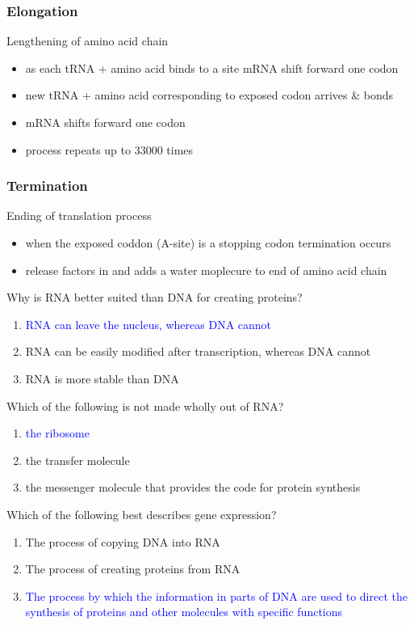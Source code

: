 \documentclass[11pt,fleqn]{book}
\begin{document}
\subsubsection{Elongation}
Lengthening of amino acid chain
\begin{itemize}
    \item as each tRNA + amino acid binds to a site mRNA shift forward one codon
    \item new tRNA + amino acid corresponding to exposed codon arrives \& bonds
    \item mRNA shifts forward one codon
    \item process repeats up to 33000 times
\end{itemize}
\subsubsection{Termination}
Ending of translation process
\begin{itemize}
    \item when the exposed coddon (A-site) is a stopping codon termination occurs
    \item release factors in and adds a water moplecure to end of amino acid chain
\end{itemize}

\begin{exercise}
    Why is RNA better suited than DNA for creating proteins?
    \begin{enumerate}
        \item \textcolor{blue}{RNA can leave the nucleus, whereas DNA cannot}
        \item RNA can be easily modified after transcription, whereas DNA cannot
        \item RNA is more stable than DNA
    \end{enumerate}
\end{exercise}
\begin{exercise}
    Which of the following is not made wholly out of RNA?
    \begin{enumerate}
        \item \textcolor{blue}{the ribosome}
        \item the transfer molecule
        \item the messenger molecule that provides the code for protein synthesis
    \end{enumerate}
\end{exercise}
\begin{exercise}
    Which of the following best describes gene expression?
    \begin{enumerate}
        \item The process of copying DNA into RNA
        \item The process of creating proteins from RNA
        \item \textcolor{blue}{The process by which the information in parts of DNA are used to direct the synthesis of proteins and other molecules with specific functions}
    \end{enumerate}
\end{exercise}
\end{document}

